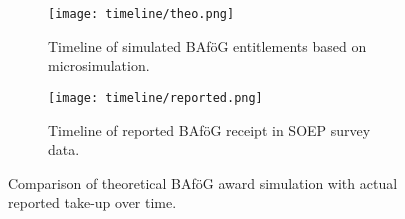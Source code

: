 \begin{figure}[!htbp]
  \centering
  \begin{subfigure}[t]{0.42\linewidth}
    \texttt{[image: timeline/theo.png]}
    \caption{Timeline of simulated BAföG entitlements based on microsimulation.}
    \label{fig:simulated_timeline}
  \end{subfigure}
  \hfill
  \begin{subfigure}[t]{0.42\linewidth}
    \texttt{[image: timeline/reported.png]}
    \caption{Timeline of reported BAföG receipt in SOEP survey data.}
    \label{fig:reported_timeline}
  \end{subfigure}
  \caption{Comparison of theoretical BAföG award simulation with actual reported take-up over time.}
  \label{fig:bafoeg_timeline_comparison}
\end{figure}



%


